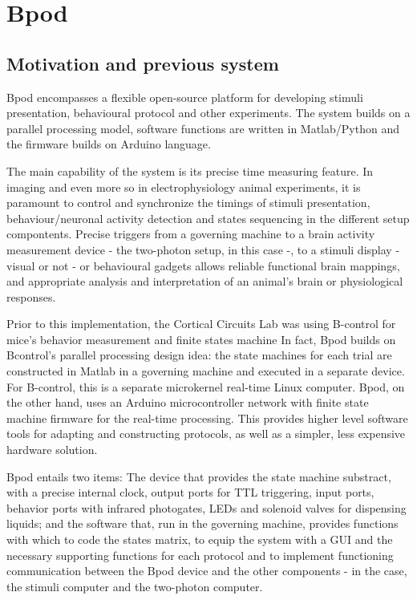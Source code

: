 \section{Bpod}
\label{sec:sectionb}
\subsection{Motivation and previous system}
\label{subsec:subasectionB}

Bpod encompasses a flexible open-source platform for developing stimuli presentation, behavioural protocol and other experiments. The system builds on a parallel processing model, software functions are written in Matlab/Python and the firmware builds on Arduino language. 

The main capability of the system is its precise time measuring feature. In imaging and even more so in electrophysiology animal experiments, it is paramount to control and synchronize the timings of stimuli presentation, behaviour/neuronal activity detection and states sequencing in the different setup compontents. Precise triggers from a governing machine to a brain activity measurement device - the two-photon setup, in this case -, to a stimuli display - visual or not - or behavioural gadgets allows reliable functional brain mappings, and appropriate analysis and interpretation of an animal's brain or physiological responses.


Prior to this implementation, the Cortical Circuits Lab was using B-control for mice's behavior measurement and finite states machine In fact, Bpod builds on Bcontrol's parallel processing design idea: the state machines for each trial are constructed in Matlab in a governing machine and executed in a separate device. For B-control, this is a separate microkernel real-time Linux computer. Bpod, on the other hand, uses an Arduino microcontroller network with finite state machine firmware for the real-time processing. This provides higher level software tools for adapting and constructing protocols, as well as a simpler, less expensive hardware solution.


Bpod entails two items: The device that provides the state machine substract, with a precise internal clock, output ports for TTL triggering, input ports, behavior ports with infrared photogates, LEDs and solenoid valves for dispensing liquids; and the software that, run in the governing machine, provides functions with which to code the states matrix, to equip the system with a GUI and the necessary supporting functions for each protocol and to implement functioning communication between the Bpod device and the other components - in  the case, the stimuli computer and the two-photon computer. 

